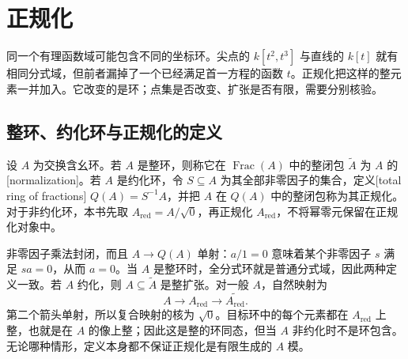 
\section{正规化}\label{b3:sec:0604}

同一个有理函数域可能包含不同的坐标环。尖点的 \(k[t^2,t^3]\) 与直线的 \(k[t]\) 就有相同分式域，但前者漏掉了一个已经满足首一方程的函数 \(t\)。正规化把这样的整元素一并加入。它改变的是环；点集是否改变、扩张是否有限，需要分别核验。

\subsection{整环、约化环与正规化的定义}\label{b3:subsec:0604:01}

\begin{definition}\label{b3:def:normalization}
	设 \(A\) 为交换含幺环。若 \(A\) 是整环，则称它在 \(\operatorname{Frac}(A)\) 中的整闭包 \(\widetilde A\) 为 \(A\) 的[normalization]。若 \(A\) 是约化环，令 \(S\subseteq A\) 为其全部非零因子的集合，定义[total ring of fractions] \(Q(A)=S^{-1}A\)，并把 \(A\) 在 \(Q(A)\) 中的整闭包称为其正规化。对于非约化环，本书先取 \(A_{\mathrm{red}}=A/\sqrt0\)，再正规化 \(A_{\mathrm{red}}\)，不将幂零元保留在正规化对象中。
\end{definition}

非零因子乘法封闭，而且 \(A\to Q(A)\) 单射：\(a/1=0\) 意味着某个非零因子 \(s\) 满足 \(sa=0\)，从而 \(a=0\)。当 \(A\) 是整环时，全分式环就是普通分式域，因此两种定义一致。若 \(A\) 约化，则 \(A\subseteq\widetilde A\) 是整扩张。对一般 \(A\)，自然映射为
\[
	A\longrightarrow A_{\mathrm{red}}\longrightarrow \widetilde{A_{\mathrm{red}}}.
\]
第二个箭头单射，所以复合映射的核为 \(\sqrt0\)。目标环中的每个元素都在 \(A_{\mathrm{red}}\) 上整，也就是在 \(A\) 的像上整；因此这是整的环同态，但当 \(A\) 非约化时不是环包含。无论哪种情形，定义本身都不保证正规化是有限生成的 \(A\) 模。

